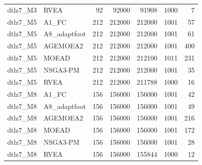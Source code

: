 \begin{tabular}{llrrrrr}
dtlz7_M3 & RVEA & 92 & 92000 & 91908 & 1000 & 7 \\
dtlz7_M5 & A1_FC & 212 & 212000 & 212000 & 1001 & 57 \\
dtlz7_M5 & A8_adaptfoot & 212 & 212000 & 212000 & 1001 & 61 \\
dtlz7_M5 & AGEMOEA2 & 212 & 212000 & 212000 & 1001 & 400 \\
dtlz7_M5 & MOEAD & 212 & 212000 & 212100 & 1011 & 231 \\
dtlz7_M5 & NSGA3-PM & 212 & 212000 & 212000 & 1001 & 35 \\
dtlz7_M5 & RVEA & 212 & 212000 & 211788 & 1000 & 16 \\
dtlz7_M8 & A1_FC & 156 & 156000 & 156000 & 1001 & 42 \\
dtlz7_M8 & A8_adaptfoot & 156 & 156000 & 156000 & 1001 & 49 \\
dtlz7_M8 & AGEMOEA2 & 156 & 156000 & 156000 & 1001 & 216 \\
dtlz7_M8 & MOEAD & 156 & 156000 & 156000 & 1001 & 172 \\
dtlz7_M8 & NSGA3-PM & 156 & 156000 & 156000 & 1001 & 28 \\
dtlz7_M8 & RVEA & 156 & 156000 & 155844 & 1000 & 12 \\
\bottomrule
\end{tabular}
